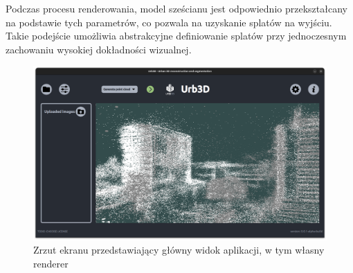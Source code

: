 Podczas procesu renderowania, model sześcianu jest odpowiednio przekształcany na podstawie tych parametrów, co pozwala na uzyskanie splatów na wyjściu. Takie podejście umożliwia abstrakcyjne definiowanie splatów przy jednoczesnym zachowaniu wysokiej dokładności wizualnej.

\begin{figure}[!ht]
    \centering
    \includegraphics[width=\textwidth]{images/cloud_rendering.png}
    \caption{Zrzut ekranu przedstawiający główny widok aplikacji, w tym własny renderer}
    \label{fig:rendering}
\end{figure}